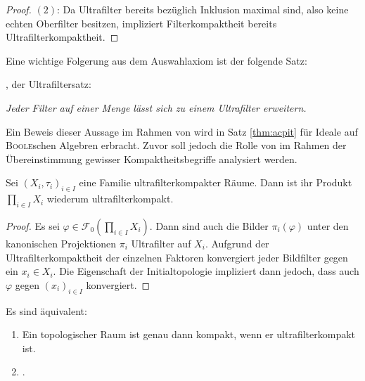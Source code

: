 \begin{proof}
  $(2)$: Da Ultrafilter bereits bezüglich Inklusion maximal sind, also keine echten Oberfilter besitzen, impliziert Filterkompaktheit bereits Ultrafilterkompaktheit.
\end{proof}

Eine wichtige Folgerung aus dem Auswahlaxiom ist der folgende Satz:
\begin{defn}
    \UFT, der Ultrafiltersatz: 
      \begin{addmargin}[2em]{2em}%
        \textit{Jeder Filter auf einer Menge lässt sich zu einem Ultrafilter erweitern.}
      \end{addmargin}
\end{defn}

Ein Beweis dieser Aussage im Rahmen von \ZFC wird in Satz \ref{thm:acpit} für Ideale auf \textsc{Boole}schen Algebren erbracht. 
Zuvor soll jedoch die Rolle von \UFT im Rahmen der Übereinstimmung gewisser Kompaktheitsbegriffe analysiert werden.

\begin{lem}
  \label{lem:uftprod}
  Sei $(X_i,\tau_i)_{i \in I}$ eine Familie ultrafilterkompakter Räume. 
  Dann ist ihr Produkt $\prod_{i \in I} X_i$ wiederum ultrafilterkompakt.
\end{lem}

\begin{proof}
  Es sei $\varphi \in \mathcal{F}_0(\prod_{i \in I} X_i)$.
  Dann sind auch die Bilder $\pi_i(\varphi)$ unter den kanonischen Projektionen $\pi_i$ Ultrafilter auf $X_i$.
  Aufgrund der Ultrafilterkompaktheit der einzelnen Faktoren konvergiert jeder Bildfilter gegen ein $x_i \in X_i$.
  Die Eigenschaft der Initialtopologie impliziert dann jedoch, dass auch $\varphi$ gegen $(x_i)_{i \in I}$ konvergiert.
\end{proof}

\begin{thm}
  \label{thm:uftcompact}
  Es sind äquivalent:
  \begin{enumerate}[(1)]
    \item Ein topologischer Raum ist genau dann kompakt, wenn er ultrafilterkompakt ist.
    \item \UFT.
  \end{enumerate}
\end{thm}

